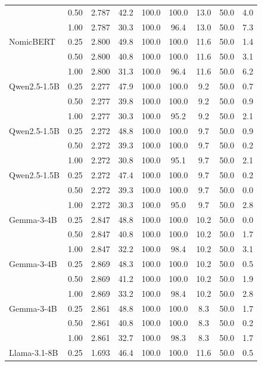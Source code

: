 \begin{tabular}{@{}lcccccccc@{}}
     & 0.50 & 2.787 & 42.2 & 100.0 & 100.0 & 13.0 & 50.0 & 4.0 \\
     & 1.00 & 2.787 & 30.3 & 100.0 & 96.4 & 13.0 & 50.0 & 7.3 \\
    NomicBERT & 0.25 & 2.800 & 49.8 & 100.0 & 100.0 & 11.6 & 50.0 & 1.4 \\
     & 0.50 & 2.800 & 40.8 & 100.0 & 100.0 & 11.6 & 50.0 & 3.1 \\
     & 1.00 & 2.800 & 31.3 & 100.0 & 96.4 & 11.6 & 50.0 & 6.2 \\
    Qwen2.5-1.5B & 0.25 & 2.277 & 47.9 & 100.0 & 100.0 & 9.2 & 50.0 & 0.7 \\
     & 0.50 & 2.277 & 39.8 & 100.0 & 100.0 & 9.2 & 50.0 & 0.9 \\
     & 1.00 & 2.277 & 30.3 & 100.0 & 95.2 & 9.2 & 50.0 & 2.1 \\
    Qwen2.5-1.5B & 0.25 & 2.272 & 48.8 & 100.0 & 100.0 & 9.7 & 50.0 & 0.9 \\
     & 0.50 & 2.272 & 39.3 & 100.0 & 100.0 & 9.7 & 50.0 & 0.2 \\
     & 1.00 & 2.272 & 30.8 & 100.0 & 95.1 & 9.7 & 50.0 & 2.1 \\
    Qwen2.5-1.5B & 0.25 & 2.272 & 47.4 & 100.0 & 100.0 & 9.7 & 50.0 & 0.2 \\
     & 0.50 & 2.272 & 39.3 & 100.0 & 100.0 & 9.7 & 50.0 & 0.0 \\
     & 1.00 & 2.272 & 30.3 & 100.0 & 95.0 & 9.7 & 50.0 & 2.8 \\
    Gemma-3-4B & 0.25 & 2.847 & 48.8 & 100.0 & 100.0 & 10.2 & 50.0 & 0.0 \\
     & 0.50 & 2.847 & 40.8 & 100.0 & 100.0 & 10.2 & 50.0 & 1.7 \\
     & 1.00 & 2.847 & 32.2 & 100.0 & 98.4 & 10.2 & 50.0 & 3.1 \\
    Gemma-3-4B & 0.25 & 2.869 & 48.3 & 100.0 & 100.0 & 10.2 & 50.0 & 0.5 \\
     & 0.50 & 2.869 & 41.2 & 100.0 & 100.0 & 10.2 & 50.0 & 1.9 \\
     & 1.00 & 2.869 & 33.2 & 100.0 & 98.4 & 10.2 & 50.0 & 2.8 \\
    Gemma-3-4B & 0.25 & 2.861 & 48.8 & 100.0 & 100.0 & 8.3 & 50.0 & 1.7 \\
     & 0.50 & 2.861 & 40.8 & 100.0 & 100.0 & 8.3 & 50.0 & 0.2 \\
     & 1.00 & 2.861 & 32.7 & 100.0 & 98.3 & 8.3 & 50.0 & 1.7 \\
    Llama-3.1-8B & 0.25 & 1.693 & 46.4 & 100.0 & 100.0 & 11.6 & 50.0 & 0.5 \\

\end{tabular}
